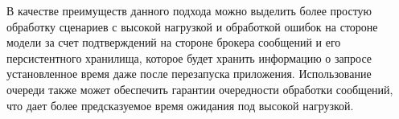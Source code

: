 В качестве преимуществ данного подхода можно выделить более простую обработку сценариев с высокой нагрузкой
и обработкой ошибок на стороне модели за счет подтверждений на стороне брокера сообщений и его персистентного хранилища,
которое будет хранить информацию о запросе установленное время даже после перезапуска приложения. Использование
очереди также может обеспечить гарантии очередности обработки сообщений, что дает более предсказуемое время ожидания
под высокой нагрузкой. 
